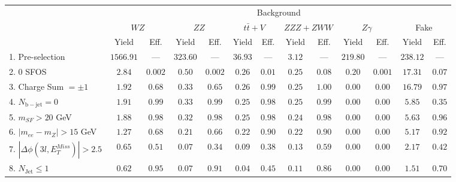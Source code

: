 \begin{tabular}{l||c|c||c|c||c|c||c|c||c|c||c|c}
\hline
 &  \multicolumn{12}{c||}{Background} \\
 & \multicolumn{2}{c||}{$WZ$} & \multicolumn{2}{c||}{$ZZ$} & \multicolumn{2}{c||}{$t\bar{t}+V$} & \multicolumn{2}{c||}{$ZZZ+ZWW$} & \multicolumn{2}{c||}{$Z\gamma$} & \multicolumn{2}{c||}{Fake}  \\ 
 & Yield & Eff. & Yield & Eff. & Yield & Eff. & Yield & Eff. & Yield & Eff. & Yield & Eff. \\
\hline\hline
1. Pre-selection &  $1566.91$ & --- &  $323.60$ &  --- &  $36.93$ &  --- &  $3.12$ & --- &  $219.80$ &  --- &  $238.12$ &  --- \\ 
\hline
2. 0 SFOS &  $2.84$ &  $0.002$ &  $0.50$ &  $0.002$ &  $0.26$ &  $0.01$ &  $0.25$ &  $0.08$ &  $0.20$ &  $0.001$ &  $17.31$ &  $0.07$ \\ 
\hline
3. Charge Sum $= \pm 1$ &  $1.92$ &  $0.68$ &  $0.33$ &  $0.65$ &  $0.26$ &  $0.99$ &  $0.25$ &  $1.00$ &  $0.00$ &  $0.00$ &  $16.79$ &  $0.97$ \\ 
\hline
4. $N_{\mathrm{b-jet}} = 0$ &  $1.91$ &  $0.99$ &  $0.33$ &  $0.99$ &  $0.25$ &  $0.98$ &  $0.25$ &  $0.99$ &  $0.00$ &  $0.00$ &  $5.85$ &  $0.35$ \\ 
\hline
5. $m_{SF} > 20$ GeV &  $1.88$ &  $0.98$ &  $0.32$ &  $0.98$ &  $0.25$ &  $0.98$ &  $0.24$ &  $0.98$ &  $0.00$ &  $0.00$ &  $5.63$ &  $0.96$ \\ 
\hline
6. $|m_{ee} - m_{Z}| > 15$ GeV &  $1.27$ &  $0.68$ &  $0.21$ &  $0.66$ &  $0.22$ &  $0.90$ &  $0.22$ &  $0.90$ &  $0.00$ &  $0.00$ &  $5.17$ &  $0.92$ \\ 
\hline
7. $|\Delta\phi(3l,E_{T}^{Miss})| > 2.5$ &  $0.65$ &  $0.51$ &  $0.07$ &  $0.34$ &  $0.09$ &  $0.38$ &  $0.13$ &  $0.59$ &  $0.00$ &  $0.00$ &  $2.17$ &  $0.42$ \\ 
\hline
8. $N_{\mathrm{Jet}} \leq 1$ &  $0.62$ &  $0.95$ &  $0.07$ &  $0.91$ &  $0.04$ &  $0.45$ &  $0.11$ &  $0.86$ &  $0.00$ &  $0.00$ &  $1.51$ &  $0.70$ \\ 
\hline
\end{tabular}



